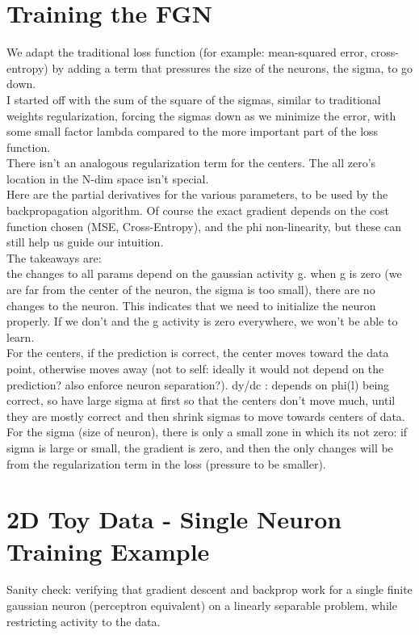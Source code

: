 \documentclass{article}
\begin{document}
\section{Training the FGN}
We adapt the traditional loss function (for example: mean-squared error, cross-entropy) by adding a term that pressures the size of the neurons, the sigma, to go down. \\
I started off with the sum of the square of the sigmas, similar to traditional weights regularization, forcing the sigmas down as we minimize the error, with some small factor lambda compared to the more important part of the loss function.\\
There isn't an analogous regularization term for the centers. The all zero's location in the N-dim space isn't special. \\
Here are the partial derivatives for the various parameters, to be used by the backpropagation algorithm. Of course the exact gradient depends on the cost function chosen (MSE, Cross-Entropy), and the phi non-linearity, but these can still help us guide our intuition.\\
The takeaways are:\\
the changes to all params depend on the gaussian activity g. when g is zero (we are far from the center of the neuron, the sigma is too small), there are no changes to the neuron. This indicates that we need to initialize the neuron properly. If we don't and the g activity is zero everywhere, we won't be able to learn.\\
For the centers, if the prediction is correct, the center moves toward the data point, otherwise moves away (not to self: ideally it would not depend on the prediction? also enforce neuron separation?). 
dy/dc : depends on phi(l) being correct, so have large sigma at first so that the centers don't move much, until they are mostly correct and then shrink sigmas to move towards centers of data.\\
For the sigma (size of neuron), there is only a small zone in which its not zero: if sigma is large or small, the gradient is zero, and then the only changes will be from the regularization term in the loss (pressure to be smaller).



\section{2D Toy Data - Single Neuron Training Example}
Sanity check: verifying that gradient descent and backprop work for a single finite gaussian neuron (perceptron equivalent) on a linearly separable problem, while restricting activity to the data.\\
\end{document}
